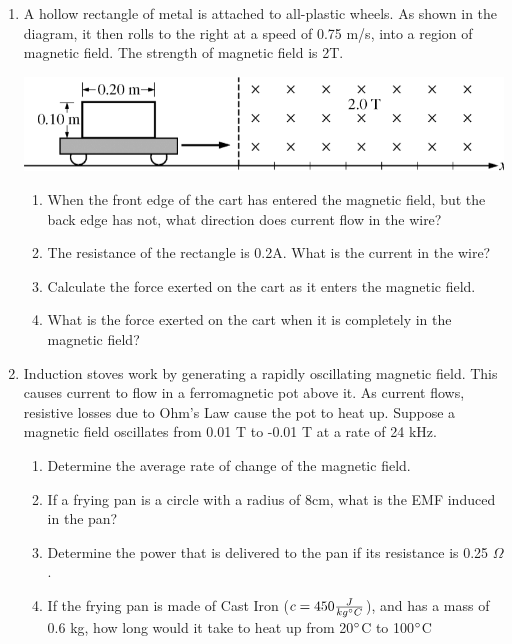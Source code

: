 \documentclass[letterpaper, 12pt]{article}
\begin{document}
\begin{enumerate}
	
	\vspace{1in}
		\item A hollow rectangle of metal is attached to all-plastic wheels.  As shown in the diagram, it then rolls to the right at a speed of 0.75 m/s, into a region of magnetic field. The strength of magnetic field is 2T.
		\begin{center}
				\includegraphics[height=.5in]{inductioncard.png}
		\end{center}
		\begin{enumerate}
			\item When the front edge of the cart has entered the magnetic field, but the back edge has not, what direction does current flow in the wire?
			\vspace{0.5in}
			\item The resistance of the rectangle is 0.2A.  What is the current in the wire?
			\vspace{0.5in}
			\item Calculate the force exerted on the cart as it enters the magnetic field.
			\vspace{0.5in}
			\item What is the force exerted on the cart when it is completely in the magnetic field?
			\vspace{0.5in}
		\end{enumerate}
	
	
		\item Induction stoves work by generating a rapidly oscillating magnetic field.  This causes current to flow in a ferromagnetic pot above it.  As current flows, resistive losses due to Ohm's Law cause the pot to heat up.  Suppose a magnetic field oscillates from 0.01 T to -0.01 T at a rate of 24 kHz.   
	\begin{enumerate}
		\item Determine the average rate of change of the magnetic field.  
		\vspace{.5in}
		\item If a frying pan is a circle with a radius of 8cm, what is the EMF induced in the pan?
			\vspace{.5in}
		\item Determine the power that is delivered to the pan if its resistance is 0.25 $\Omega$.
			\vspace{.5in}
		\item If the frying pan is made of Cast Iron ($ c = 450 \frac{J} {kg  \degree C}$), and has a mass of 0.6 kg, how long would it take to heat up from 20$\degree$C to 100$\degree$C
		
		
	\end{enumerate}
	
	\vspace{1in}

	
\end{enumerate}
 
\end{document}
